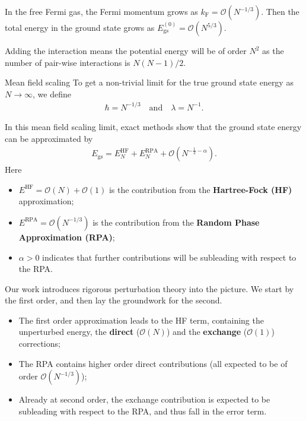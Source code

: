 \documentclass{beamer}
\begin{document}
\begin{frame}
	In the free Fermi gas, the Fermi momentum grows as $k_{\mathrm{F}}=\mathcal{O}(N^{-1/3})$.
	Then the total energy in the ground state grows as
	$E^{(0)}_{\mathrm{gs}}=\mathcal{O}(N^{5/3})$.

	Adding the interaction means the potential energy will be of order $N^2$ as the number
	of pair-wise interactions is $N(N-1)/2$.

	\begin{block}{Mean field scaling}
		To get a non-trivial limit for the true ground state energy as $N\to\infty$, we define
		\begin{align*}
			\hbar = N^{-1/3} \quad\textrm{and}\quad \lambda = N^{-1}.
		\end{align*}
	\end{block}
\end{frame}

\begin{frame}
	In this mean field scaling limit, exact methods show that the ground state energy can be
	approximated by
	\begin{align*}
		E_{\mathrm{gs}} = E^{\mathrm{HF}}_N + E^{\mathrm{RPA}}_N
		+ \mathcal{O}(N^{-\frac{1}{3} -\alpha}).
	\end{align*}
	Here
	\begin{itemize}
		\item $E^{\mathrm{HF}}=\mathcal{O}(N)+\mathcal{O}(1)$ is the contribution from the
			\textbf{Hartree-Fock (HF)} approximation;
		\item $E^{\mathrm{RPA}}=\mathcal{O}(N^{-1/3})$ is the contribution from the
			\textbf{Random Phase Approximation (RPA)};
		\item $\alpha>0$ indicates that further contributions will be subleading with respect
			to the RPA.
	\end{itemize}
\end{frame}

\begin{frame}
	Our work introduces rigorous perturbation theory into the picture. We start by the first
	order, and then lay the groundwork for the second.

	\begin{itemize}
		\item The first order approximation leads to the HF term, containing the unperturbed
			energy, the \textbf{direct} ($\mathcal{O}(N)$) and the \textbf{exchange}
			($\mathcal{O}(1)$) corrections;
		\item The RPA contains higher order direct contributions (all expected to be of order
			$\mathcal{O}(N^{-1/3})$);
		\item Already at second order, the exchange contribution is expected to be subleading
			with respect to the RPA, and thus fall in the error term.
	\end{itemize}
\end{frame}
\end{document}
